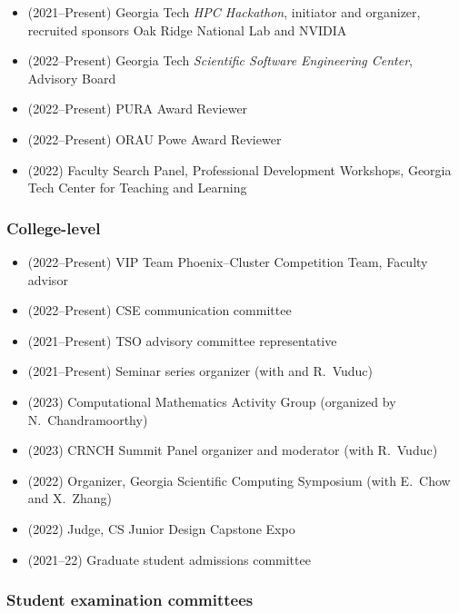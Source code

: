 \begin{itemize}
    \item (2021--Present) Georgia Tech \textit{HPC Hackathon}, initiator and organizer, recruited sponsors Oak Ridge National Lab and NVIDIA 
    \item (2022--Present) Georgia Tech \textit{Scientific Software Engineering Center}, Advisory Board
    \item (2022--Present) PURA Award Reviewer
    \item (2022--Present) ORAU Powe Award Reviewer
    \item (2022) Faculty Search Panel, Professional Development Workshops, Georgia Tech Center for Teaching and Learning
\end{itemize}

\subsubsection{College-level}

\begin{itemize}
    \item (2022--Present) VIP Team Phoenix--Cluster Competition Team, Faculty advisor
    \item (2022--Present) CSE communication committee
    \item (2021--Present) TSO advisory committee representative
    \item (2021--Present) Seminar series organizer (with \Florian and R.\ Vuduc)
    \item (2023) Computational Mathematics Activity Group (organized by N.\ Chandramoorthy)
    \item (2023) CRNCH Summit Panel organizer and moderator (with R.\ Vuduc)
    \item (2022) Organizer, Georgia Scientific Computing Symposium (with E.\ Chow and X.\ Zhang)
    \item (2022) Judge, CS Junior Design Capstone Expo
    \item (2021--22) Graduate student admissions committee
\end{itemize}

\subsubsection{Student examination committees}

